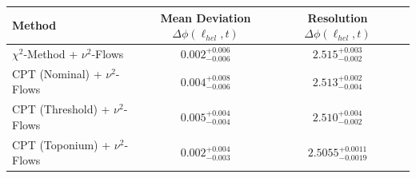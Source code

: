     \begin{tabular}{lccc}
        \toprule
        Method & Mean Deviation $\Delta\phi(\ell_{hel}, t)$ & Resolution $\Delta\phi(\ell_{hel}, t)$ \\
        \midrule
        $\chi^2$-Method + $\nu^2$-Flows & $0.002^{+0.006}_{-0.006}$ & $2.515^{+0.003}_{-0.002}$ \\
        CPT (Nominal) + $\nu^2$-Flows & $0.004^{+0.008}_{-0.006}$ & $2.513^{+0.002}_{-0.004}$ \\
        CPT (Threshold) + $\nu^2$-Flows & $0.005^{+0.004}_{-0.004}$ & $2.510^{+0.004}_{-0.002}$ \\
        CPT (Toponium) + $\nu^2$-Flows & $0.002^{+0.004}_{-0.003}$ & $2.5055^{+0.0011}_{-0.0019}$ \\
        \bottomrule
    \end{tabular}